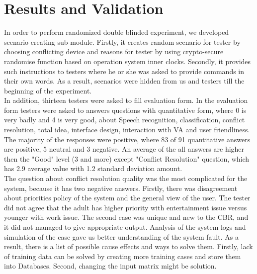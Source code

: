 \documentclass{llncs}
\begin{document}
    \section{Results and Validation}
    In order to perform randomized double
    blinded experiment, we developed scenario creating sub-module.
    Firstly, it creates random scenario for tester by choosing
    conflicting device and reasons for tester by using crypto-secure randomise function based on operation system inner
    clocks.
    Secondly, it provides such instructions to testers where he or she was
    asked to provide commands in their own words.
    As a result, scenarios were hidden from us and testers till
    the beginning of the experiment.\\
    In addition, thirteen testers were asked to fill evaluation form.
    In the evaluation form testers were asked to answers questions with quantitative form, where 0 is very badly and 4 is very good, about Speech recognition,
    classification, conflict resolution, total idea, interface design, interaction with VA and user friendliness.
    The majority of the responses were positive, where 83 of 91 quantitative answers are positive, 5 neutral and 3 negative.
    An average of the all answers are higher then the "Good" level (3 and more) except "Conflict Resolution" question, which
    has 2.9 average value with 1.2 standard deviation amount.\\
    The question about conflict resolution quality was the most complicated for the system, because it has two negative answers.
    Firstly, there was disagreement about priorities policy of the system and the general view of the user.
    The tester did not agree that the adult has higher priority with entertainment issue versus younger with work issue.
    The second case was unique and new to the CBR, and it did not managed to give appropriate output.
    Analysis of the system logs and simulation of the case gave us better understanding of the system fault.
    As a result, there is a list of possible cause effects and ways to solve them.
    Firstly, lack of training data can be solved by creating more training cases and store them into Databases.
    Second, changing the input matrix might be solution.
\end{document}
